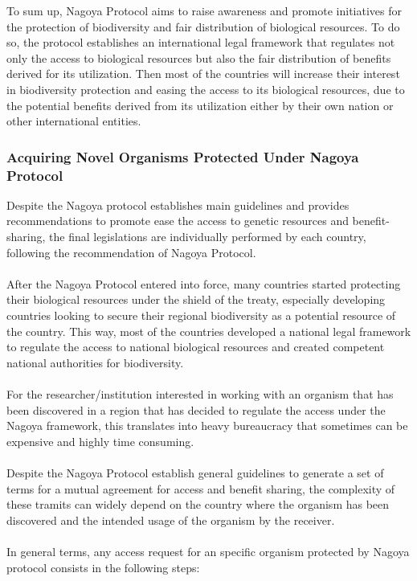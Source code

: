 To sum up, Nagoya Protocol aims to raise awareness and promote initiatives for the protection of biodiversity and fair distribution of biological resources. To do so, the protocol establishes an international legal framework that regulates not only the access to biological resources but also the fair distribution of benefits derived for its utilization. Then most of the countries will increase their interest in biodiversity protection and easing the access to its biological resources, due to the potential benefits derived from its utilization either by their own nation or other international entities. 

\subsubsection{Acquiring Novel Organisms Protected Under Nagoya Protocol}
Despite the Nagoya protocol establishes main guidelines and provides recommendations to promote ease the access to genetic resources and benefit-sharing, the final legislations are individually performed by each country, following the recommendation of Nagoya Protocol. \\ \\
After the Nagoya Protocol  entered into force, many countries started protecting their biological resources under the shield of the treaty, especially developing countries looking to secure their regional biodiversity as a potential resource of the country. This way, most of the countries developed a national legal framework to regulate the access to national biological resources and created competent national authorities for biodiversity. \\ \\
For the researcher/institution interested in working with an organism that has been discovered in a region that has decided to regulate the access under the Nagoya framework, this translates into heavy bureaucracy that sometimes can be expensive and highly time consuming. \\ \\
Despite the Nagoya Protocol establish general guidelines to generate a set of terms for a mutual agreement for access and benefit sharing, the complexity of these tramits can widely depend on the country where the organism has been discovered and the intended usage of the organism by the receiver. \\ \\
In general terms, any access request for an specific organism protected by Nagoya protocol consists in the following steps:

